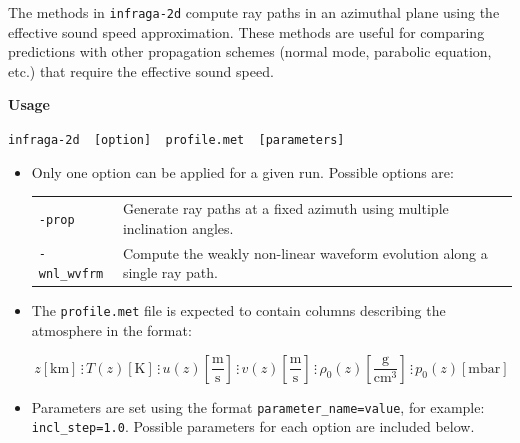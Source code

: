 \documentclass[10pt]{article}
\begin{document}
The methods in \verb=infraga-2d= compute ray paths in an azimuthal plane using the effective sound speed approximation.  These methods are useful for comparing predictions with other propagation schemes (normal mode, parabolic equation, etc.) that require the effective sound speed.

\vspace{0.02\textheight}

\hspace{-0.25in}\textbf{Usage} 

\begin{center} \begin{large}
\verb=infraga-2d  [option]  profile.met  [parameters]=
\end{large} \end{center}

\begin{itemize}
 \item Only one option can be applied for a given run.  Possible options are:

\begin{tabular}{  l l }
  \verb=-prop=		& Generate ray paths at a fixed azimuth using multiple inclination angles. \\
  \verb=-wnl_wvfrm=	& Compute the weakly non-linear waveform evolution along a single ray path.
 \end{tabular}
 
 \item The \verb=profile.met= file is expected to contain columns describing the atmosphere in the format:

\begin{equation*} 
 z \left[ \text{km} \right] \hspace{2pt} \vdots \hspace{2pt}
 T(z) \left[ \text{K} \right] \hspace{2pt} \vdots \hspace{2pt}
 u(z) \left[ \frac{\text{m}}{\text{s}} \right] \hspace{2pt} \vdots \hspace{2pt}
 v(z) \left[ \frac{\text{m}}{\text{s}} \right] \hspace{2pt} \vdots \hspace{2pt}
 \rho_0(z) \left[ \frac{\text{g}}{\text{cm}^3} \right] \hspace{2pt} \vdots \hspace{2pt}
 p_0(z) \left[ \text{mbar} \right] 
\end{equation*}

 \item Parameters are set using the format \verb#parameter_name=value#, for example: \verb#incl_step=1.0#.  Possible parameters for each option are included below.
 \end{itemize}
\end{document}
